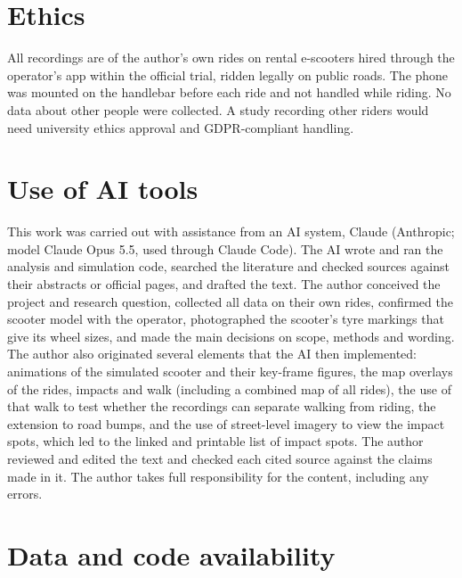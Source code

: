 
\section*{Ethics}

All recordings are of the author's own rides on rental e-scooters hired through the
operator's app within the official trial, ridden legally on public roads. The phone was
mounted on the handlebar before each ride and not handled while riding. No data about
other people were collected. A study recording other riders would need university
ethics approval and GDPR-compliant handling.

\section*{Use of AI tools}

This work was carried out with assistance from an AI system, Claude (Anthropic;
model Claude Opus 5.5, used through Claude Code). The AI wrote and ran the analysis and
simulation code, searched the literature and checked sources against their abstracts or
official pages, and drafted the text. The author conceived the project and research question,
collected all data on their own rides, confirmed the scooter model with the operator,
photographed the scooter's tyre markings that give its wheel sizes, and made the main
decisions on scope, methods and wording. The author also originated several elements that
the AI then implemented: animations of the simulated scooter and their key-frame figures, the
map overlays of the rides, impacts and walk (including a combined map of all rides), the use
of that walk to test whether the recordings can separate walking from riding, the extension
to road bumps, and the use of street-level imagery to view the impact spots, which led to
the linked and printable list of impact spots. The author
reviewed and edited the text and checked each cited source against the claims made in it. The
author takes full responsibility for the content, including any errors.

\section*{Data and code availability}

